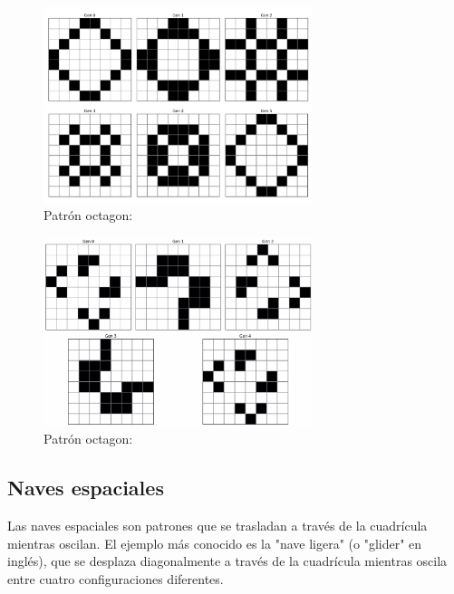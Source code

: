 \documentclass[]{article}
\begin{document}
    \begin{figure}[H]
      \centering
      \includegraphics[width=0.7\textwidth]{../assets/oscillator/octagon_2/octagon_2.png}
      \caption{Patrón octagon: }
      \label{fig:octagon}
      \end{figure}

      \begin{figure}[H]
        \centering
        \includegraphics[width=0.7\textwidth]{../assets/oscillator/mazing/mazing.jpg}
        \caption{Patrón octagon: }
        \label{fig:mazing}
        \end{figure}

\subsection{Naves espaciales}
Las naves espaciales son patrones que se trasladan a través de la cuadrícula mientras oscilan. El ejemplo más conocido es la "nave ligera" (o "glider" en inglés), que se desplaza diagonalmente a través de la cuadrícula mientras oscila entre cuatro configuraciones diferentes.
\end{document}
